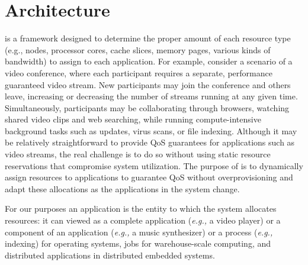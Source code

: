 \section{\pacora Architecture}




\pacora is a framework designed to determine the proper amount of each resource type (e.g., nodes, processor cores, cache slices, memory pages, various kinds of bandwidth) to assign to each application.  For example, consider a scenario of a video conference, where each participant requires a separate,
performance guaranteed video stream. New participants may join the conference and others leave,
increasing or decreasing the number of streams running at any given time.
Simultaneously, participants may be collaborating through browsers, watching
shared video clips and web searching, while running compute-intensive
background tasks such as updates, virus scans, or file indexing. Although it may be relatively straightforward to provide QoS guarantees for applications such as video streams, the real challenge is to do so without using static resource reservations that compromise system utilization.  The purpose of \pacora is to dynamically assign resources to applications to guarantee QoS without overprovisioning and adapt these allocations as the applications in the system change.

For our purposes an application is the entity to which the system allocates resources: it can viewed as a complete application (\emph{e.g.,} a video player) or a component of an application (\emph{e.g.,} a music synthesizer) or a process (\emph{e.g.,} indexing) for operating systems, jobs for warehouse-scale computing, and distributed applications in distributed embedded systems. 

